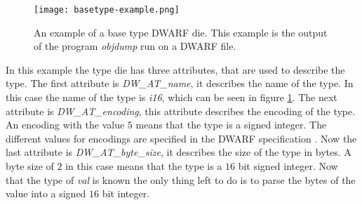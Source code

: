 \begin{figure}[h]
	\centering
	\texttt{[image: basetype-example.png]}
	\caption{An example of a base type \gls{DWARF} \gls{die}. This example is the output of the program \emph{objdump} run on a \gls{DWARF} file.}
	\label{fig:basetypeexample}
\end{figure}


In this example the type \gls{die} has three attributes, that are used to describe the type.
The first attribute is \emph{DW\_AT\_name}, it describes the name of the type.
In this case the name of the type is \emph{i16}, which can be seen in figure \ref{fig:basetypeexample}.
The next attribute is \emph{DW\_AT\_encoding}, this attribute describes the encoding of the type.
An encoding with the value $5$ means that the type is a signed integer\cite{dwarf}.
The different values for encodings are specified in the \gls{DWARF} specification \cite{dwarf}.
Now the last attribute is \emph{DW\_AT\_byte\_size}, it describes the size of the type in bytes.
A byte size of $2$ in this case means that the type is a $16$ bit signed integer.
Now that the type of \emph{val} is known the only thing left to do is to parse the bytes of the value into a signed $16$ bit integer.


